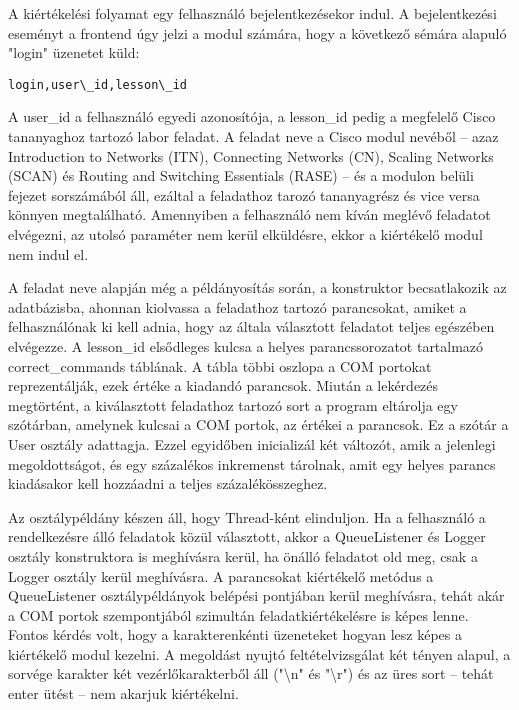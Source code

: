 \documentclass[12pt]{report}
\begin{document}
A kiértékelési folyamat egy felhasználó bejelentkezésekor indul. A bejelentkezési eseményt a frontend úgy jelzi a modul számára, hogy a következő sémára alapuló "login" üzenetet küld:

\begin{verbatim}
login,user\_id,lesson\_id
\end{verbatim}

A user\_id a felhasználó egyedi azonosítója, a lesson\_id pedig a megfelelő Cisco tananyaghoz tartozó labor feladat. A feladat neve a Cisco modul nevéből -- azaz Introduction to Networks (ITN), Connecting Networks (CN), Scaling Networks (SCAN) és Routing and Switching Essentials (RASE) -- és a modulon belüli fejezet sorszámából áll, ezáltal a feladathoz tarozó tananyagrész és vice versa könnyen megtalálható.
Amennyiben a felhasználó nem kíván meglévő feladatot elvégezni, az utolsó paraméter nem kerül elküldésre, ekkor a kiértékelő modul nem indul el.

A feladat neve alapján még a példányosítás során, a konstruktor becsatlakozik az adatbázisba, ahonnan kiolvassa a feladathoz tartozó parancsokat, amiket a felhasználónak ki kell adnia, hogy az általa választott feladatot teljes egészében elvégezze.
A lesson\_id elsődleges kulcsa a helyes parancssorozatot tartalmazó correct\_commands táblának. A tábla többi oszlopa a COM portokat reprezentálják, ezek értéke a kiadandó parancsok.
Miután a lekérdezés megtörtént, a kiválasztott feladathoz tartozó sort a program eltárolja egy szótárban, amelynek kulcsai a COM portok, az értékei a parancsok. Ez a szótár a User osztály adattagja.
Ezzel egyidőben inicializál két változót, amik a jelenlegi megoldottságot, és egy százalékos inkremenst tárolnak, amit egy helyes parancs kiadásakor kell hozzáadni a teljes százalékösszeghez.


Az osztálypéldány készen áll, hogy Thread-ként elinduljon. Ha a felhasználó a rendelkezésre álló feladatok közül választott, akkor a QueueListener és Logger osztály konstruktora is meghívásra kerül, ha önálló feladatot old meg, csak a Logger osztály kerül meghívásra.
A parancsokat kiértékelő metódus a QueueListener osztálypéldányok belépési pontjában kerül meghívásra, tehát akár a COM portok szempontjából szimultán feladatkiértékelésre is képes lenne.
Fontos kérdés volt, hogy a karakterenkénti üzeneteket hogyan lesz képes a kiértékelő modul kezelni. A megoldást nyujtó feltételvizsgálat két tényen alapul, a sorvége karakter két vezérlőkarakterből áll ("\textbackslash n" és "\textbackslash r") és az üres sort -- tehát enter ütést -- nem akarjuk kiértékelni.
\end{document}
